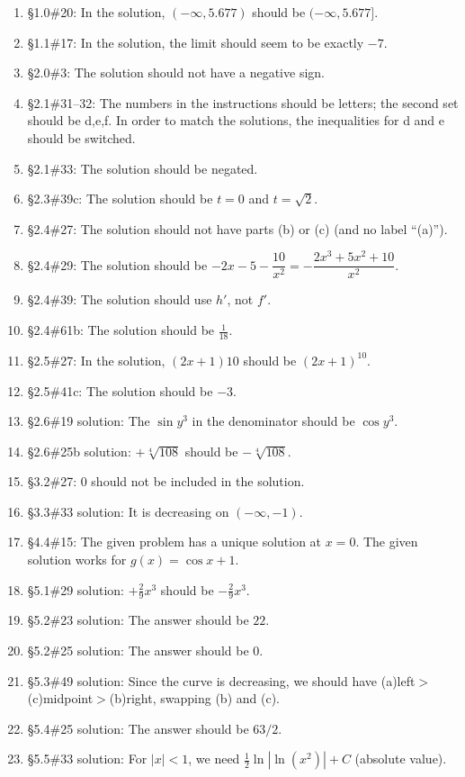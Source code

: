 \documentclass{amsart}
\newcommand{\abs}[1]{\left\lvert#1\right\rvert}
\begin{document}
\begin{enumerate}
\item \S1.0\#20: In the solution, $(-\infty,5.677)$ should be $(-\infty,5.677]$.
\item \S1.1\#17: In the solution, the limit should seem to be exactly $-7$.
\item \S2.0\#3: The solution should not have a negative sign.
\item \S2.1\#31--32: The numbers in the instructions should be letters; the second set should be d,e,f.  In order to match the solutions, the inequalities for d and e should be switched.
\item \S2.1\#33: The solution should be negated.
\item \S2.3\#39c: The solution should be $t=0$ and $t=\sqrt2$.
\item \S2.4\#27: The solution should not have parts (b) or (c) (and no label ``(a)'').
\item \S2.4\#29: The solution should be $-2x-5-\dfrac{10}{x^2}=-\dfrac{2x^3+5x^2+10}{x^2}$.
\item \S2.4\#39: The solution should use $h'$, not $f'$.
\item \S2.4\#61b: The solution should be $\frac1{18}$.
\item \S2.5\#27: In the solution, $(2x+1)10$ should be $(2x+1)^{10}$.
\item \S2.5\#41c: The solution should be $-3$.
\item \S2.6\#19 solution: The $\sin y^3$ in the denominator should be $\cos y^3$.
\item \S2.6\#25b solution: $+\sqrt[4]{108}$ should be $-\sqrt[4]{108}$.
\item \S3.2\#27: 0 should not be included in the solution.
\item \S3.3\#33 solution: It is decreasing on $(-\infty,-1)$.
\item \S4.4\#15: The given problem has a unique solution at $x=0$.  The given solution works for $g(x)=\cos x+1$.
\item \S5.1\#29 solution: $+\frac29 x^3$ should be $-\frac29 x^3$.
\item \S5.2\#23 solution: The answer should be $22$.
\item \S5.2\#25 solution: The answer should be $0$.
\item \S5.3\#49 solution: Since the curve is decreasing, we should have (a)left$>$(c)midpoint$>$(b)right, swapping (b) and (c).
\item \S5.4\#25 solution: The answer should be $63/2$.
\item \S5.5\#33 solution: For $\abs x<1$, we need $\frac12 \ln\abs{\ln \left(x^2\right)}+C$ (absolute value).

\end{enumerate}
\end{document}
